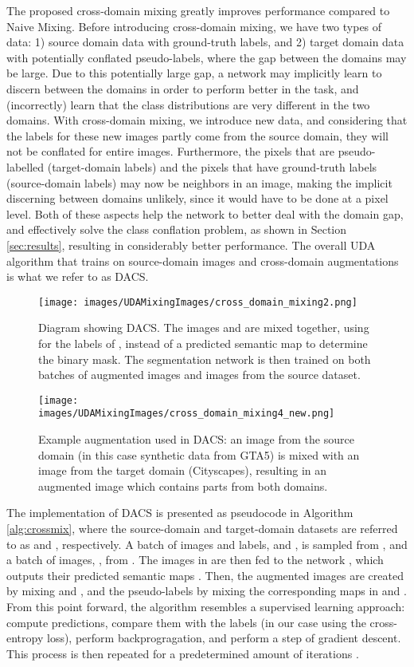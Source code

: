 \documentclass[10pt,twocolumn,letterpaper]{article}
\begin{document}
The proposed cross-domain mixing greatly improves performance compared to Naive Mixing.
Before introducing cross-domain mixing, we have two types of data: 1) source domain data with ground-truth labels, and 2) target domain data with potentially conflated pseudo-labels, where the gap between the domains may be large. Due to this potentially large gap, a network may implicitly learn to discern between the domains in order to perform better in the task, and (incorrectly) learn that the class distributions are very different in the two domains. With cross-domain mixing, we introduce new data, and considering that the labels for these new images partly come from the source domain, they will not be conflated for entire images. Furthermore, the pixels that are pseudo-labelled (target-domain labels) and the pixels that have ground-truth labels (source-domain labels) may now be neighbors in an image, making the implicit discerning between domains unlikely, since it would have to be done at a pixel level. Both of these aspects help the network to better deal with the domain gap, and effectively solve the class conflation problem, as shown in Section \ref{sec:results}, resulting in considerably better performance. The overall UDA algorithm that trains on source-domain images and cross-domain augmentations is what we refer to as DACS. 

\begin{figure}[t]
    \centering
    \texttt{[image: images/UDAMixingImages/cross\_domain\_mixing2.png]}
    \caption{Diagram showing DACS. The images  and  are mixed together, using  for the labels of , instead of a predicted semantic map to determine the binary mask. The segmentation network is then trained on both batches of augmented images and images from the source dataset.}
    \label{fig:dacs}
\end{figure}

\begin{figure}[t]
    \centering
    \texttt{[image: images/UDAMixingImages/cross\_domain\_mixing4\_new.png]}
    \caption{Example augmentation used in DACS: an image from the source domain (in this case synthetic data from GTA5) is mixed with an image from the target domain (Cityscapes), resulting in an augmented image which contains parts from both domains.}
    \label{fig:crossmix_example_image}
\end{figure}

The implementation of DACS is presented as pseudocode in Algorithm \ref{alg:crossmix}, where the source-domain and target-domain datasets are referred to as  and , respectively. A batch of images and labels,   and , is sampled from , and a batch of images, , from . The images in  are then fed to the network , which outputs their predicted semantic maps . Then, the augmented images  are created by mixing  and , and the pseudo-labels  by mixing the corresponding maps in  and . From this point forward, the algorithm resembles a supervised learning approach: compute predictions, compare them with the labels (in our case using the cross-entropy loss), perform backprogragation, and perform a step of gradient descent. This process is then repeated for a predetermined amount of iterations .
\end{document}
